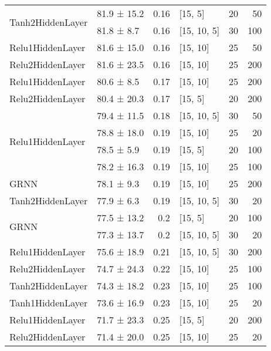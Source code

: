 \begin{table*}[h]
\begin{tabular}{llrlrr}
 \hline
\multirow{2}{*}{Tanh2HiddenLayer}         & 81.9 ± 15.2 &  0.16 & [15, 5]        &         20 &       50 \\
         & 81.8 ± 8.7  &  0.16 & [15, 10, 5]    &         30 &      100 \\
 \hline
Relu1HiddenLayer         & 81.6 ± 15.0 &  0.16 & [15, 10]       &         25 &       50 \\
 \hline
Relu2HiddenLayer         & 81.6 ± 23.5 &  0.16 & [15, 10]       &         25 &      200 \\
 \hline
Relu1HiddenLayer         & 80.6 ± 8.5  &  0.17 & [15, 10]       &         25 &      200 \\
 \hline
Relu2HiddenLayer         & 80.4 ± 20.3 &  0.17 & [15, 5]        &         20 &      200 \\
 \hline
\multirow{4}{*}{Relu1HiddenLayer}         & 79.4 ± 11.5 &  0.18 & [15, 10, 5]    &         30 &       50 \\
         & 78.8 ± 18.0 &  0.19 & [15, 10]       &         25 &       20 \\
         & 78.5 ± 5.9  &  0.19 & [15, 5]        &         20 &      100 \\
         & 78.2 ± 16.3 &  0.19 & [15, 10]       &         25 &      100 \\
 \hline
GRNN         & 78.1 ± 9.3  &  0.19 & [15, 10]       &         25 &      200 \\
 \hline
Tanh2HiddenLayer         & 77.9 ± 6.3  &  0.19 & [15, 10, 5]    &         30 &       20 \\
 \hline
\multirow{2}{*}{GRNN}         & 77.5 ± 13.2 &  0.2  & [15, 5]        &         20 &      100 \\
         & 77.3 ± 13.7 &  0.2  & [15, 10, 5]    &         30 &       20 \\
 \hline
Relu1HiddenLayer         & 75.6 ± 18.9 &  0.21 & [15, 10, 5]    &         30 &      200 \\
 \hline
Relu2HiddenLayer         & 74.7 ± 24.3 &  0.22 & [15, 10]       &         25 &      100 \\
 \hline
Tanh2HiddenLayer         & 74.3 ± 18.2 &  0.23 & [15, 10]       &         25 &      100 \\
 \hline
Tanh1HiddenLayer         & 73.6 ± 16.9 &  0.23 & [15, 10]       &         25 &       20 \\
 \hline
Relu1HiddenLayer         & 71.7 ± 23.3 &  0.25 & [15, 5]        &         20 &      200 \\
 \hline
Relu2HiddenLayer         & 71.4 ± 20.0 &  0.25 & [15, 10]       &         25 &       20 \\

\end{tabular}
\end{table*}
